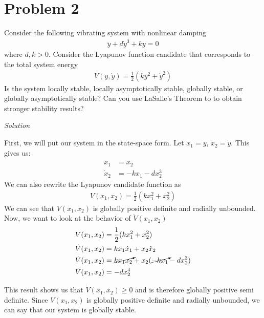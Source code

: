 \documentclass{article}
\begin{document}
  \newpage

  \section{Problem 2}

  Consider the following vibrating system with nonlinear damping
  \begin{align*}
    \ddot{y}+d\dot{y}^3+ky=0
  \end{align*}
  where $d,k>0$. Consider the Lyapunov function candidate that corresponds to
  the total system energy
  \begin{align*}
    V(y,\dot{y})=\frac{1}{2}(ky^2+\dot{y}^2)
  \end{align*}
  Is the system locally stable, locally asymptotically stable, globally stable,
  or globally asymptotically stable? Can you use LaSalle's Theorem to to obtain
  stronger stability results? \newline \newline

  \noindent \textit{Solution} \newline \newline

  First, we will put our system in the state-space form. Let $x_1 = y$, $x_2 =
  \dot{y}$. This gives us:
  \begin{align*}
    \dot{x}_1 &= x_2 \\
    \dot{x}_2 &= -kx_1 - dx_2^3
  \end{align*}
  \indent We can also rewrite the Lyapunov candidate function as
  \begin{align*}
    V(x_1,x_2) = \frac{1}{2}(kx_1^2 + x_2^2)
  \end{align*}
  We can see that $V(x_1,x_2)$ is globally positive definite and radially
  unbounded. Now, we want to look at the behavior of $\dot{V}(x_1,x_2)$
  \begin{align*}
    V(x_1,x_2) &= \frac{1}{2}(kx_1^2 + x_2^2) \\
    \dot{V}(x_1,x_2) &= kx_1\dot{x}_1 + x_2\dot{x}_2 \\
    \dot{V}(x_1,x_2) &= \cancelto{}{kx_1x_2} + x_2(\cancelto{}{-kx_1} - dx_2^3) \\
    \dot{V}(x_1,x_2) &= -dx_2^4 \\
  \end{align*}

  This result shows us that $\dot{V}(x_1,x_2) \geq 0$  and is therefore globally positive semi
  definite. Since $V(x_1,x_2)$ is globally positive definite and radially
  unbounded, we can say that our system is globally stable. \newline
\end{document}
